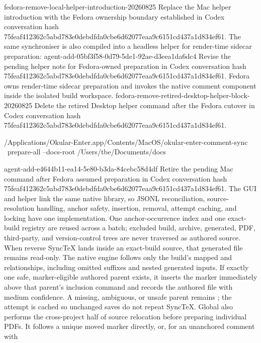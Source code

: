 \agentProposedEdit
  {fedora-remove-local-helper-introduction-20260825}
  {Replace the Mac helper introduction with the Fedora ownership boundary established in Codex conversation hash 75feaf412362c5abd783e0debdfda0cbe6d62077eaa9c6151cd437a1d834ef61.}
  {The same synchroniser is also compiled into a headless helper for render-time sidecar preparation:}
  {}
\agentProposedEdit
  {agent-add-05bf3f58-0d79-5de1-92ae-d3eea1da6dc4}
  {Revise the pending helper note for Fedora-owned preparation in Codex conversation hash 75feaf412362c5abd783e0debdfda0cbe6d62077eaa9c6151cd437a1d834ef61.}
  {}
  {Fedora owns render-time sidecar preparation and invokes the native comment component inside the isolated build workspace.}
\agentProposedEdit
  {fedora-remove-retired-desktop-helper-block-20260825}
  {Delete the retired Desktop helper command after the Fedora cutover in Codex conversation hash 75feaf412362c5abd783e0debdfda0cbe6d62077eaa9c6151cd437a1d834ef61.}
  {
\begin{DocCode}
/Applications/Okular-Enter.app/Contents/MacOS/okular-enter-comment-sync \
  prepare-all --docs-root /Users/tbe/Documents/docs
\end{DocCode}}
  {}
\agentProposedEdit
  {agent-add-e4644b11-ea14-5e80-b3da-84cebc58d4df}
  {Retire the pending Mac command after Fedora assumed preparation in Codex conversation hash 75feaf412362c5abd783e0debdfda0cbe6d62077eaa9c6151cd437a1d834ef61.}
  {}
  {}
The GUI and helper link the same native library, so JSONL reconciliation, source-resolution handling, anchor safety, insertion, removal, attempt caching, and locking have one implementation.
One anchor-occurrence index and one exact-build registry are reused across a batch; excluded build, archive, generated, PDF, third-party, and version-control trees are never traversed as authored source.
When reverse SyncTeX lands inside an exact-build \code{generated/} source, that generated file remains read-only.
The native engine follows only the build's mapped \code{\textbackslash input} and \code{\textbackslash include} relationships, including omitted  suffixes and nested generated inputs.
If exactly one safe, marker-eligible authored parent exists, it inserts the marker immediately above that parent's inclusion command and records the authored file with medium confidence.
A missing, ambiguous, or unsafe parent remains \code{needs_anchor}; the attempt is cached so unchanged saves do not repeat SyncTeX.
Global \code{prepare-all} also performs the cross-project half of source
relocation before preparing individual PDFs.
It follows a unique moved marker directly, or, for an unanchored comment with
